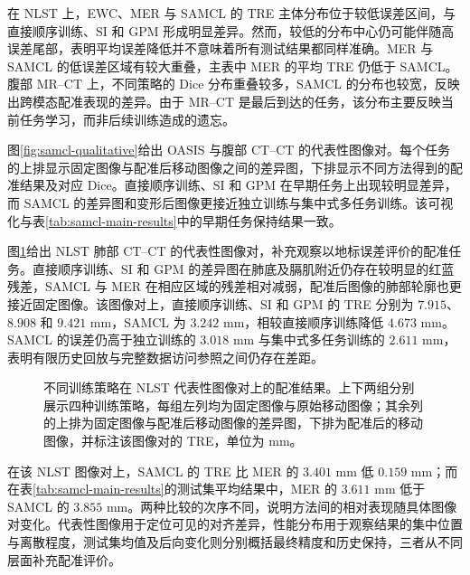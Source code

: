 在 NLST 上，EWC、MER 与 SAMCL 的 TRE 主体分布位于较低误差区间，与直接顺序训练、SI 和 GPM 形成明显差异。然而，较低的分布中心仍可能伴随高误差尾部，表明平均误差降低并不意味着所有测试结果都同样准确。MER 与 SAMCL 的低误差区域有较大重叠，主表中 MER 的平均 TRE 仍低于 SAMCL。腹部 MR--CT 上，不同策略的 Dice 分布重叠较多，SAMCL 的分布也较宽，反映出跨模态配准表现的差异。由于 MR--CT 是最后到达的任务，该分布主要反映当前任务学习，而非后续训练造成的遗忘。

图\ref{fig:samcl-qualitative}给出 OASIS 与腹部 CT--CT 的代表性图像对。每个任务的上排显示固定图像与配准后移动图像之间的差异图，下排显示不同方法得到的配准结果及对应 Dice。直接顺序训练、SI 和 GPM 在早期任务上出现较明显差异，而 SAMCL 的差异图和变形后图像更接近独立训练与集中式多任务训练。该可视化与表\ref{tab:samcl-main-results}中的早期任务保持结果一致。


图\ref{fig:samcl-qualitative-nlst}给出 NLST 肺部 CT--CT 的代表性图像对，补充观察以地标误差评价的配准任务。直接顺序训练、SI 和 GPM 的差异图在肺底及膈肌附近仍存在较明显的红蓝残差，SAMCL 与 MER 在相应区域的残差相对减弱，配准后图像的肺部轮廓也更接近固定图像。该图像对上，直接顺序训练、SI 和 GPM 的 TRE 分别为 $7.915$、$8.908$ 和 $9.421$ mm，SAMCL 为 $3.242$ mm，相较直接顺序训练降低 $4.673$ mm。SAMCL 的误差仍高于独立训练的 $3.018$ mm 与集中式多任务训练的 $2.611$ mm，表明有限历史回放与完整数据访问参照之间仍存在差距。

\begin{figure}[htbp]
\centering
{}
\caption[NLST 代表性图像对的配准结果]{不同训练策略在 NLST 代表性图像对上的配准结果。上下两组分别展示四种训练策略，每组左列均为固定图像与原始移动图像；其余列的上排为固定图像与配准后移动图像的差异图，下排为配准后的移动图像，并标注该图像对的 TRE，单位为 mm。}
\label{fig:samcl-qualitative-nlst}
\end{figure}

在该 NLST 图像对上，SAMCL 的 TRE 比 MER 的 $3.401$ mm 低 $0.159$ mm；而在表\ref{tab:samcl-main-results}的测试集平均结果中，MER 的 $3.611$ mm 低于 SAMCL 的 $3.855$ mm。两种比较的次序不同，说明方法间的相对表现随具体图像对变化。代表性图像用于定位可见的对齐差异，性能分布用于观察结果的集中位置与离散程度，测试集均值及后向变化则分别概括最终精度和历史保持，三者从不同层面补充配准评价。

